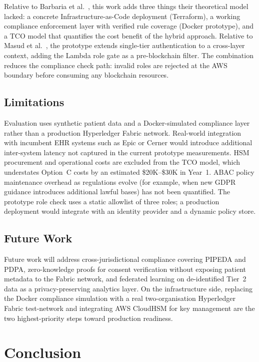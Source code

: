 \documentclass[10pt,twocolumn,a4paper]{article}
\begin{document}
Relative to Barbaria et al.~\cite{barbaria2025}, this work adds three
things their theoretical model lacked: a concrete Infrastructure-as-Code
deployment (Terraform), a working compliance enforcement layer with
verified rule coverage (Docker prototype), and a TCO model that
quantifies the cost benefit of the hybrid approach. Relative to
Masud et al.~\cite{masud2021}, the prototype extends single-tier
authentication to a cross-layer context, adding the Lambda role gate
as a pre-blockchain filter. The combination reduces the compliance check
path: invalid roles are rejected at the AWS boundary before consuming
any blockchain resources.

\subsection{Limitations}

Evaluation uses synthetic patient data and a Docker-simulated
compliance layer rather than a production Hyperledger Fabric network.
Real-world integration with incumbent EHR systems such as Epic or
Cerner would introduce additional inter-system latency not captured
in the current prototype measurements. HSM procurement and
operational costs are excluded from the TCO model, which understates
Option~C costs by an estimated \$20K--\$30K in Year~1. ABAC policy
maintenance overhead as regulations evolve (for example, when new
GDPR guidance introduces additional lawful bases) has not been
quantified. The prototype role check uses a static allowlist of three
roles; a production deployment would integrate with an identity
provider and a dynamic policy store.

\subsection{Future Work}

Future work will address cross-jurisdictional compliance covering
PIPEDA and PDPA, zero-knowledge proofs for consent verification
without exposing patient metadata to the Fabric network, and federated
learning on de-identified Tier~2 data as a privacy-preserving
analytics layer. On the infrastructure side, replacing the Docker
compliance simulation with a real two-organisation Hyperledger Fabric
test-network and integrating AWS CloudHSM for key management are the
two highest-priority steps toward production readiness.

\section{Conclusion}
\end{document}
